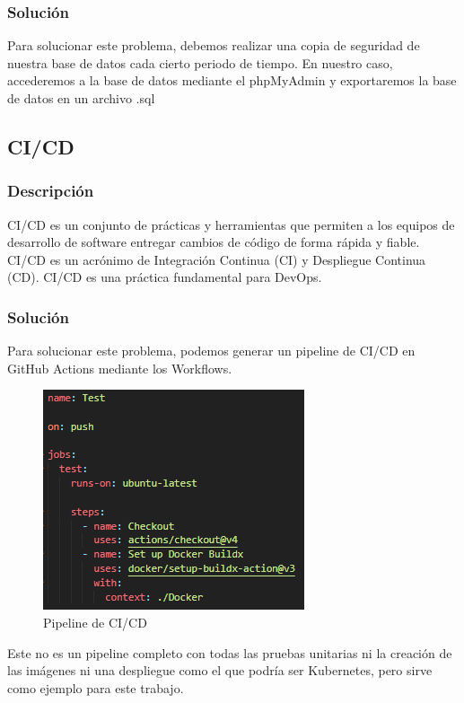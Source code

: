 \documentclass{report}
\begin{document}
                \subsubsection{Solución}
                    Para solucionar este problema, debemos realizar una copia de seguridad de nuestra base de datos cada cierto periodo de tiempo.
                    En nuestro caso, accederemos a la base de datos mediante el phpMyAdmin y exportaremos la base de datos en un archivo .sql
            \clearpage
            \subsection{CI/CD}
                \subsubsection{Descripción}
                    CI/CD es un conjunto de prácticas y herramientas que permiten a los equipos de desarrollo de software entregar cambios de código de forma rápida y fiable. CI/CD es un acrónimo de Integración Continua (CI) y Despliegue Continua (CD). CI/CD es una práctica fundamental para DevOps.
                \subsubsection{Solución}
                    Para solucionar este problema, podemos generar un pipeline de CI/CD en GitHub Actions mediante los Workflows.
                    \begin{figure}[H]
                        \centering
                        \includegraphics[width=\textwidth]{./img/vulnerabilidades/3.8/2.1.png}
                        \caption{Pipeline de CI/CD}
                    \end{figure}
                    Este no es un pipeline completo con todas las pruebas unitarias ni la creación de las imágenes ni una despliegue como el que podría ser Kubernetes, pero sirve como ejemplo para este trabajo.
            \clearpage
\end{document}
